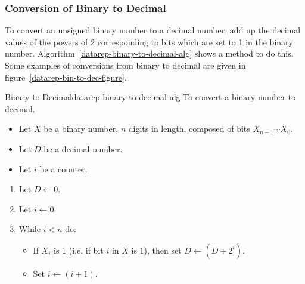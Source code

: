 \subsubsection{Conversion of Binary to Decimal}
\label{datarep-binary-to-decimal-sec}

To convert an unsigned binary number to a decimal number, add
up the decimal values of the powers of 2 corresponding to bits
which are set to 1 in the binary number.
Algorithm~\ref{datarep-binary-to-decimal-alg} shows a method to do this.
Some examples of conversions from binary to decimal
are given in figure~\ref{datarep-bin-to-dec-figure}.

\begin{algorithm}{Binary to Decimal}{datarep-binary-to-decimal-alg}{
        To convert a binary number to decimal.
}

\begin{itemize}
\item   Let $X$ be a binary number, $n$ digits in length, composed of bits
                $X_{n-1} \cdots X_{0}$.
\item   Let $D$ be a decimal number.
\item   Let $i$ be a counter.
\end{itemize}

\begin{enumerate}
\item   Let $D \leftarrow 0$.
\item   Let $i \leftarrow 0$.
\item   While $i < n$ do:
        \begin{itemize}
        \item   If $X_{i}$ is $1$
                (i.e. if bit $i$ in $X$ is $1$),
                then set $D \leftarrow (D + 2^{i})$.
        \item   Set $i \leftarrow (i + 1)$.
        \end{itemize}
\end{enumerate}
\end{algorithm}


